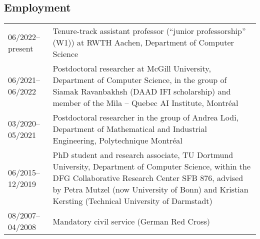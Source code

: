 \documentclass[11pt, a4paper, DIV=12]{scrartcl}
\begin{document}
\subsection*{Employment}
\begin{tabular}{p{3.0cm}p{11.5cm}}
    06/2022--present& Tenure-track assistant professor (``junior professorship'' (W1)) at RWTH Aachen, Department of Computer Science\\
	06/2021--06/2022& Postdoctoral researcher at McGill University, Department of Computer Science, in the group of Siamak Ravanbakhsh (DAAD IFI scholarship) and member of the Mila -- Quebec AI Institute, Montréal\\
	03/2020--05/2021& Postdoctoral researcher in the group of Andrea Lodi, Department of Mathematical and Industrial Engineering, Polytechnique Montréal\\
	06/2015--12/2019&PhD student and research associate, TU Dortmund University, Department of Computer Science, within the DFG Collaborative Research Center SFB 876, advised by Petra Mutzel (now University of Bonn) and Kristian Kersting (Technical University of Darmstadt)\\
	08/2007--04/2008&Mandatory civil service (German Red Cross)\\
\end{tabular}

\renewcommand{\refname}{\large\bfseries Publications}
\end{document}
